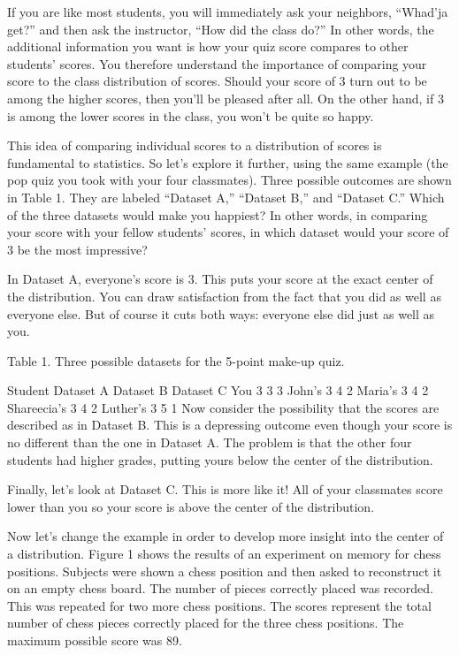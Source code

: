 \documentclass[
]{book}
\begin{document}
If you are like most students, you will immediately ask your neighbors, ``Whad'ja get?'' and then ask the instructor, ``How did the class do?'' In other words, the additional information you want is how your quiz score compares to other students' scores. You therefore understand the importance of comparing your score to the class distribution of scores. Should your score of 3 turn out to be among the higher scores, then you'll be pleased after all. On the other hand, if 3 is among the lower scores in the class, you won't be quite so happy.

This idea of comparing individual scores to a distribution of scores is fundamental to statistics. So let's explore it further, using the same example (the pop quiz you took with your four classmates). Three possible outcomes are shown in Table 1. They are labeled ``Dataset A,'' ``Dataset B,'' and ``Dataset C.'' Which of the three datasets would make you happiest? In other words, in comparing your score with your fellow students' scores, in which dataset would your score of 3 be the most impressive?

In Dataset A, everyone's score is 3. This puts your score at the exact center of the distribution. You can draw satisfaction from the fact that you did as well as everyone else. But of course it cuts both ways: everyone else did just as well as you.

Table 1. Three possible datasets for the 5-point make-up quiz.

Student Dataset A Dataset B Dataset C
You 3 3 3
John's 3 4 2
Maria's 3 4 2
Shareecia's 3 4 2
Luther's 3 5 1
Now consider the possibility that the scores are described as in Dataset B. This is a depressing outcome even though your score is no different than the one in Dataset A. The problem is that the other four students had higher grades, putting yours below the center of the distribution.

Finally, let's look at Dataset C. This is more like it! All of your classmates score lower than you so your score is above the center of the distribution.

Now let's change the example in order to develop more insight into the center of a distribution. Figure 1 shows the results of an experiment on memory for chess positions. Subjects were shown a chess position and then asked to reconstruct it on an empty chess board. The number of pieces correctly placed was recorded. This was repeated for two more chess positions. The scores represent the total number of chess pieces correctly placed for the three chess positions. The maximum possible score was 89.
\end{document}
